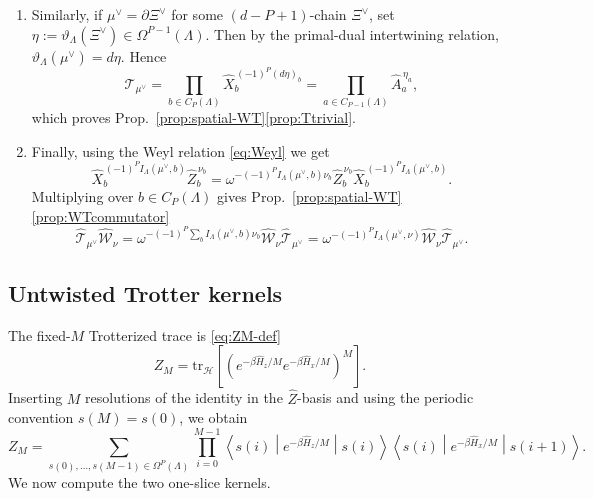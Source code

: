 \documentclass[dvipsnames,a4paper]{article}
\numberwithin{equation}{section}
\theoremstyle{definition}
\theoremstyle{remark}
\newcommand{\tr}{\mathrm{tr}}
\newcommand{\matrixel}[3]{\left\langle #1 \middle| #2 \middle| #3 \right\rangle}
\begin{document}
\begin{enumerate}
	\item Similarly, if \(\mu^\vee=\partial\Xi^\vee\) for some
	\((d-P+1)\)-chain \(\Xi^\vee\), set $\eta:=\vartheta_\Lambda(\Xi^\vee)\in\Omega^{P-1}(\Lambda)$. Then
	by the primal-dual intertwining relation, $\vartheta_\Lambda(\mu^\vee)=d\eta$.
	Hence
	\begin{equation}
		\hat{\mathcal T}_{\mu^\vee}
		=
		\prod_{b\in C_P(\Lambda)}
		\hat X_b^{\,(-1)^P(d\eta)_b}
		=
		\prod_{a\in C_{P-1}(\Lambda)}
		\hat A_a^{\,\eta_a},
	\end{equation}
	which proves Prop.~\ref{prop:spatial-WT}\ref{prop:Ttrivial}.
	
	\item Finally, using the Weyl relation \eqref{eq:Weyl} we get
	\begin{equation}
		\hat X_b^{\,(-1)^P I_\Lambda(\mu^\vee,b)}
		\hat Z_b^{\,\nu_b}
		=
		\omega^{-(-1)^P I_\Lambda(\mu^\vee,b)\nu_b}
		\hat Z_b^{\,\nu_b}
		\hat X_b^{\,(-1)^P I_\Lambda(\mu^\vee,b)}.
	\end{equation}
	Multiplying over \(b\in C_P(\Lambda)\) gives Prop.~\ref{prop:spatial-WT}\ref{prop:WTcommutator}
	\begin{equation}
		\hat{\mathcal T}_{\mu^\vee}\hat{\mathcal W}_\nu
		=
		\omega^{-(-1)^P\sum_b I_\Lambda(\mu^\vee,b)\nu_b}
		\hat{\mathcal W}_\nu\hat{\mathcal T}_{\mu^\vee}
		=
		\omega^{-(-1)^P I_\Lambda(\mu^\vee,\nu)}
		\hat{\mathcal W}_\nu\hat{\mathcal T}_{\mu^\vee}.
	\end{equation}
\end{enumerate}



\subsection{Untwisted Trotter kernels}
\label{app:vanillaTr}

The fixed-\(M\) Trotterized trace is \eqref{eq:ZM-def}
\begin{equation}
	Z_M
	=
	\tr_{\mathcal H}
	\left[
	\left(
	e^{-\beta\hat H_z/M}e^{-\beta\hat H_x/M}
	\right)^M
	\right].
\end{equation}
Inserting \(M\) resolutions of the identity in the \(\hat Z\)-basis and using the
periodic convention \(s(M)=s(0)\), we obtain
\begin{equation}
	Z_M
	=
	\sum_{s(0),\dots,s(M-1)\in\Omega^P(\Lambda)}
	\prod_{i=0}^{M-1}
	\matrixel{s(i)}{e^{-\beta\hat H_z/M}}{s(i)}
	\matrixel{s(i)}{e^{-\beta\hat H_x/M}}{s(i+1)}.
	\label{eq:ZM-slices}
\end{equation}
We now compute the two one-slice kernels.
\end{document}

